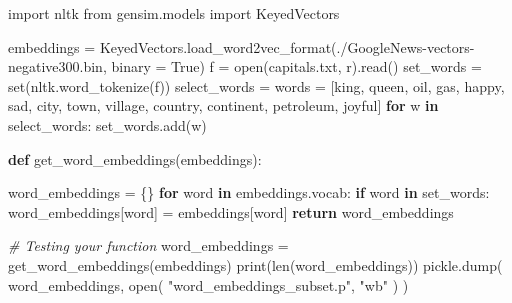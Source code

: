 \documentclass[11pt]{article}
\newenvironment{Shaded}{}{}
\newcommand{\KeywordTok}[1]{\textcolor[rgb]{0.00,0.44,0.13}{\textbf{{#1}}}}
\newcommand{\StringTok}[1]{\textcolor[rgb]{0.25,0.44,0.63}{{#1}}}
\newcommand{\CommentTok}[1]{\textcolor[rgb]{0.38,0.63,0.69}{\textit{{#1}}}}
\newcommand{\NormalTok}[1]{{#1}}
\newcommand{\ImportTok}[1]{{#1}}
\newcommand{\VariableTok}[1]{\textcolor[rgb]{0.10,0.09,0.49}{{#1}}}
\newcommand{\ControlFlowTok}[1]{\textcolor[rgb]{0.00,0.44,0.13}{\textbf{{#1}}}}
\newcommand{\OperatorTok}[1]{\textcolor[rgb]{0.40,0.40,0.40}{{#1}}}
\newcommand{\BuiltInTok}[1]{{#1}}
\begin{document}
\begin{Shaded}
\begin{Highlighting}[]
\ImportTok{import}\NormalTok{ nltk}
\ImportTok{from}\NormalTok{ gensim.models }\ImportTok{import}\NormalTok{ KeyedVectors}


\NormalTok{embeddings }\OperatorTok{=}\NormalTok{ KeyedVectors.load\_word2vec\_format(}\StringTok{\textquotesingle{}./GoogleNews{-}vectors{-}negative300.bin\textquotesingle{}}\NormalTok{, binary }\OperatorTok{=} \VariableTok{True}\NormalTok{)}
\NormalTok{f }\OperatorTok{=} \BuiltInTok{open}\NormalTok{(}\StringTok{\textquotesingle{}capitals.txt\textquotesingle{}}\NormalTok{, }\StringTok{\textquotesingle{}r\textquotesingle{}}\NormalTok{).read()}
\NormalTok{set\_words }\OperatorTok{=} \BuiltInTok{set}\NormalTok{(nltk.word\_tokenize(f))}
\NormalTok{select\_words }\OperatorTok{=}\NormalTok{ words }\OperatorTok{=}\NormalTok{ [}\StringTok{\textquotesingle{}king\textquotesingle{}}\NormalTok{, }\StringTok{\textquotesingle{}queen\textquotesingle{}}\NormalTok{, }\StringTok{\textquotesingle{}oil\textquotesingle{}}\NormalTok{, }\StringTok{\textquotesingle{}gas\textquotesingle{}}\NormalTok{, }\StringTok{\textquotesingle{}happy\textquotesingle{}}\NormalTok{, }\StringTok{\textquotesingle{}sad\textquotesingle{}}\NormalTok{, }\StringTok{\textquotesingle{}city\textquotesingle{}}\NormalTok{, }\StringTok{\textquotesingle{}town\textquotesingle{}}\NormalTok{, }\StringTok{\textquotesingle{}village\textquotesingle{}}\NormalTok{, }\StringTok{\textquotesingle{}country\textquotesingle{}}\NormalTok{, }\StringTok{\textquotesingle{}continent\textquotesingle{}}\NormalTok{, }\StringTok{\textquotesingle{}petroleum\textquotesingle{}}\NormalTok{, }\StringTok{\textquotesingle{}joyful\textquotesingle{}}\NormalTok{]}
\ControlFlowTok{for}\NormalTok{ w }\KeywordTok{in}\NormalTok{ select\_words:}
\NormalTok{    set\_words.add(w)}

\KeywordTok{def}\NormalTok{ get\_word\_embeddings(embeddings):}

\NormalTok{    word\_embeddings }\OperatorTok{=}\NormalTok{ \{\}}
    \ControlFlowTok{for}\NormalTok{ word }\KeywordTok{in}\NormalTok{ embeddings.vocab:}
        \ControlFlowTok{if}\NormalTok{ word }\KeywordTok{in}\NormalTok{ set\_words:}
\NormalTok{            word\_embeddings[word] }\OperatorTok{=}\NormalTok{ embeddings[word]}
    \ControlFlowTok{return}\NormalTok{ word\_embeddings}


\CommentTok{\# Testing your function}
\NormalTok{word\_embeddings }\OperatorTok{=}\NormalTok{ get\_word\_embeddings(embeddings)}
\BuiltInTok{print}\NormalTok{(}\BuiltInTok{len}\NormalTok{(word\_embeddings))}
\NormalTok{pickle.dump( word\_embeddings, }\BuiltInTok{open}\NormalTok{( }\StringTok{"word\_embeddings\_subset.p"}\NormalTok{, }\StringTok{"wb"}\NormalTok{ ) )}
\end{Highlighting}
\end{Shaded}
\end{document}
